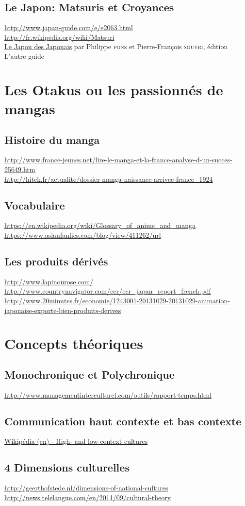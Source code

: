 \subsection{Le Japon: Matsuris et Croyances}
\noindent
\url{http://www.japan-guide.com/e/e2063.html}\\
\url{http://fr.wikipedia.org/wiki/Matsuri}\\
\underline{Le Japon des Japonais} par Philippe \textsc{pons} et Pierre-François \textsc{souyri}, édition L'autre guide

\section{Les Otakus ou les passionnés de mangas}

\subsection{Histoire du manga}
\noindent
\url{http://www.france-jeunes.net/lire-le-manga-et-la-france-analyse-d-un-succes-25649.htm}\\
\url{http://hitek.fr/actualite/dossier-manga-naissance-arrivee-france_1924}

\subsection{Vocabulaire}
\noindent
\url{https://en.wikipedia.org/wiki/Glossary_of_anime_and_manga}\\
\url{https://www.asianfanfics.com/blog/view/411262/url}

\subsection{Les produits dérivés}
\noindent
\url{http://www.lapinourose.com/}\\
\url{http://www.countrynavigator.com/ecr/ecr_japan_report_french.pdf}\\
\url{http://www.20minutes.fr/economie/1243001-20131029-20131029-animation-japonaise-exporte-bien-produits-derives}

\section{Concepts théoriques}

\subsection{Monochronique et Polychronique}
\noindent
\url{http://www.managementinterculturel.com/outils/rapport-temps.html}\\

\subsection{Communication haut contexte et bas contexte}
\noindent
\url{Wikipédia (en) - High- and low-context cultures}\\

\subsection{4 Dimensions culturelles}
\noindent
\url{http://geerthofstede.nl/dimensions-of-national-cultures}\\
\url{http://news.telelangue.com/en/2011/09/cultural-theory}
